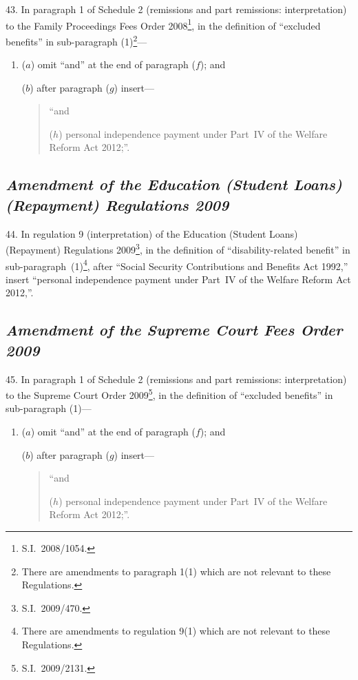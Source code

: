 \documentclass[12pt,a4paper]{article}
\begin{document}
43.  In paragraph 1 of Schedule 2 (remissions and part remissions: interpretation) to the Family Proceedings Fees Order 2008\footnote{S.I.~2008/1054.}, in the definition of “excluded benefits” in sub-paragraph (1)\footnote{There are amendments to paragraph 1(1) which are not relevant to these Regulations.}—
\begin{enumerate}\item[]
($a$) omit “and” at the end of paragraph ($f$); and

($b$) after paragraph ($g$)  insert—
\begin{quotation}
“and

($h$) personal independence payment under Part~IV of the Welfare Reform Act 2012;”.
\end{quotation}
\end{enumerate}

\subsection*{\itshape Amendment of the Education (Student Loans) (Repayment) Regulations 2009}

44.  In regulation 9 (interpretation) of the Education (Student Loans) (Repayment) Regulations 2009\footnote{S.I.~2009/470.}, in the definition of “disability-related benefit” in sub-paragraph~(1)\footnote{There are amendments to regulation 9(1) which are not relevant to these Regulations.}, after “Social Security Contributions and Benefits Act 1992,” insert “personal independence payment under Part~IV of the Welfare Reform Act 2012,”.

\subsection*{\itshape Amendment of the Supreme Court Fees Order 2009}

45.  In paragraph 1 of Schedule 2 (remissions and part remissions: interpretation) to the Supreme Court Order 2009\footnote{S.I.~2009/2131.}, in the definition of “excluded benefits” in sub-paragraph (1)—
\begin{enumerate}\item[]
($a$) omit “and” at the end of paragraph ($f$); and

($b$) after paragraph ($g$)  insert—
\begin{quotation}
“and

($h$) personal independence payment under Part~IV of the Welfare Reform Act 2012;”.
\end{quotation}
\end{enumerate}
\end{document}
